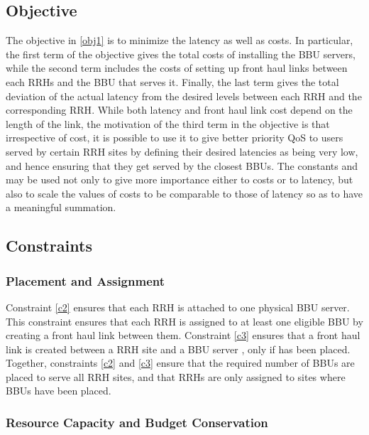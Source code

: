 \documentclass[conference]{IEEEtran}
\begin{document}
\subsection{Objective}




The objective in \eqref{obj1} is to minimize the latency as well as costs. In particular, the first term of the objective gives the total costs of installing the \ac{BBU} servers, while the second term includes the costs of setting up front haul links between each \acp{RRH} and the \ac{BBU} that serves it. Finally, the last term gives the total deviation of the actual latency from the desired levels between each \ac{RRH} and the corresponding \ac{RRH}. While both latency and front haul link cost depend on the length of the link, the motivation of the third term in the objective is that irrespective of cost, it is possible to use it to give better priority QoS to users served by certain \ac{RRH} sites by defining their desired latencies as being very low, and hence ensuring that they get served by the closest \acp{BBU}. The constants  and  may be used not only to give more importance either to costs or to latency, but also to scale the values of costs to be comparable to those of latency so as to have a meaningful summation.


\subsection{Constraints}

\subsubsection{Placement and Assignment}





Constraint \eqref{c2} ensures that each \ac{RRH} is attached to one physical BBU server. This constraint ensures that each \ac{RRH} is assigned to at least one eligible \ac{BBU} by creating a front haul link between them. Constraint \eqref{c3} ensures that a front haul link is created between a RRH site  and a \ac{BBU} server , only if  has been placed. Together, constraints \eqref{c2} and \eqref{c3} ensure that the required number of \acp{BBU} are placed to serve all RRH sites, and that \acp{RRH} are only assigned to sites where \acp{BBU} have been placed. 

\subsubsection{Resource Capacity and Budget Conservation}
\end{document}
